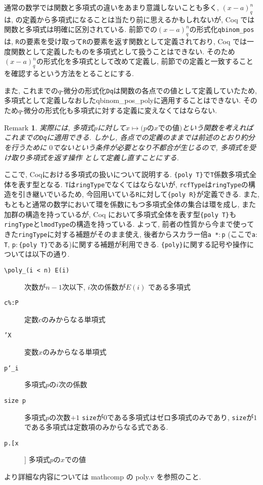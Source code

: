 \documentclass[11pt]{jsreport}
\theoremstyle{mystyle}
\newtheorem{rmk}[df]{$\textrm{Remark}$}
\newcommand{\brmk}{\begin{rmk}}
\newcommand{\ermk}{\end{rmk}}
\newcommand{\0}{\textbf{0}}
\newcommand{\1}{\textbf{1}}
\newcommand{\2}{\textbf{2}}
\begin{document}
通常の数学では関数と多項式の違いをあまり意識しないことも多く, $(x - a)^n_q$は, \cite{Kac}の定義から多項式になることは当たり前に思えるかもしれないが, Coq では関数と多項式は明確に区別されている. 前節での$(x - a)^n_q$の形式化{\tt qbinom\_pos}は, {\tt R}の要素を受け取って{\tt R}の要素を返す関数として定義されており, Coq では一度関数として定義したものを多項式として扱うことはできない. そのため$(x - a)^n_q$の形式化を多項式として改めて定義し, 前節での定義と一致することを確認するという方法をとることにする. 

また, これまでの$q$-微分の形式化{\tt Dq}は関数の各点での値として定義していたため, 多項式として定義しなおした{qbinom\_pos\_poly}に適用することはできない. そのため$q$-微分の形式化も多項式に対する定義に変えなくてはならない. 
\brmk
  実際には, 多項式$p$に対して$x \mapsto \text{($p$の$x$での値)}$という関数を考えれば
  これまでの{\tt Dq}に適用できる. しかし, 各点での定義のままでは前述のとおり約分を行うために
  $0$でないという条件が必要となり不都合が生じるので, 多項式を受け取り多項式を返す操作
  として定義し直すことにする. 
\ermk
ここで, Coqにおける多項式の扱いについて説明する. 
{\tt \{poly T\}}で{\tt T}係数多項式全体を表す型となる. {\tt T}は{\tt ringType}でなくてはならないが, {\tt rcfType}は{\tt ringType}の構造を引き継いでいるため, 今回用いている{\tt R}に対して{\tt \{poly R\}}が定義できる. 
また, もともと通常の数学において環を係数にもつ多項式全体の集合は環を成し, また加群の構造を持っているが, Coq において多項式全体を表す型{\tt \{poly T\}}も{\tt ringType}と{\tt lmodType}の構造を持っている. よって, 前者の性質から今まで使ってきた{\tt ringType}に対する補題がそのまま使え, 後者からスカラー倍{\tt a *$\colon$p} (ここで{\tt a$\colon$T}, 
{\tt p$\colon$\{poly T\}}である)に関する補題が利用できる. {\tt \{poly\}}に関する記号や操作については以下の通り. 
\begin{description}
  \item[\tt \textbackslash poly\_(i < n) E(i)] 次数が$n - 1$次以下, $i$次の係数が$E(i)$
    である多項式
  \item[\tt c\%:P] 定数$c$のみからなる単項式
  \item[\tt 'X] 変数$x$のみからなる単項式
  \item[\tt p`\_i] 多項式$p$の$i$次の係数 
  \item[\tt size p] 多項式$p$の次数$+1$
    {\tt size}が$0$である多項式はゼロ多項式のみであり, 
    {\tt size}が$1$である多項式は定数項のみからなる式である. 
  \item[\tt p.[x]] 多項式$p$の$x$での値 
\end{description}
より詳細な内容については mathcomp の poly.v を参照のこと. 
\end{document}

